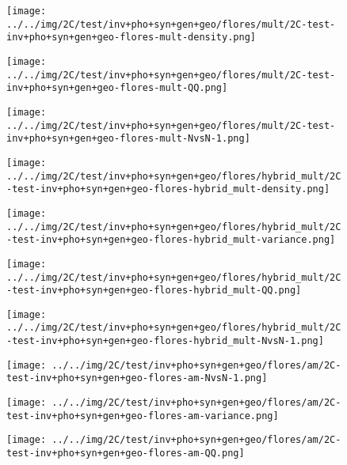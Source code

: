 \begin{figure}[H]
\centering	\texttt{[image: ../../img/2C/test/inv+pho+syn+gen+geo/flores/mult/2C-test-inv+pho+syn+gen+geo-flores-mult-density.png]}
\end{figure}
\begin{figure}[H]
\centering	\texttt{[image: ../../img/2C/test/inv+pho+syn+gen+geo/flores/mult/2C-test-inv+pho+syn+gen+geo-flores-mult-QQ.png]}
\end{figure}
\begin{figure}[H]
\centering	\texttt{[image: ../../img/2C/test/inv+pho+syn+gen+geo/flores/mult/2C-test-inv+pho+syn+gen+geo-flores-mult-NvsN-1.png]}
\end{figure}
\begin{figure}[H]
\centering	\texttt{[image: ../../img/2C/test/inv+pho+syn+gen+geo/flores/hybrid\_mult/2C-test-inv+pho+syn+gen+geo-flores-hybrid\_mult-density.png]}
\end{figure}
\begin{figure}[H]
\centering	\texttt{[image: ../../img/2C/test/inv+pho+syn+gen+geo/flores/hybrid\_mult/2C-test-inv+pho+syn+gen+geo-flores-hybrid\_mult-variance.png]}
\end{figure}
\begin{figure}[H]
\centering	\texttt{[image: ../../img/2C/test/inv+pho+syn+gen+geo/flores/hybrid\_mult/2C-test-inv+pho+syn+gen+geo-flores-hybrid\_mult-QQ.png]}
\end{figure}
\begin{figure}[H]
\centering	\texttt{[image: ../../img/2C/test/inv+pho+syn+gen+geo/flores/hybrid\_mult/2C-test-inv+pho+syn+gen+geo-flores-hybrid\_mult-NvsN-1.png]}
\end{figure}
\begin{figure}[H]
\centering	\texttt{[image: ../../img/2C/test/inv+pho+syn+gen+geo/flores/am/2C-test-inv+pho+syn+gen+geo-flores-am-NvsN-1.png]}
\end{figure}
\begin{figure}[H]
\centering	\texttt{[image: ../../img/2C/test/inv+pho+syn+gen+geo/flores/am/2C-test-inv+pho+syn+gen+geo-flores-am-variance.png]}
\end{figure}
\begin{figure}[H]
\centering	\texttt{[image: ../../img/2C/test/inv+pho+syn+gen+geo/flores/am/2C-test-inv+pho+syn+gen+geo-flores-am-QQ.png]}
\end{figure}
